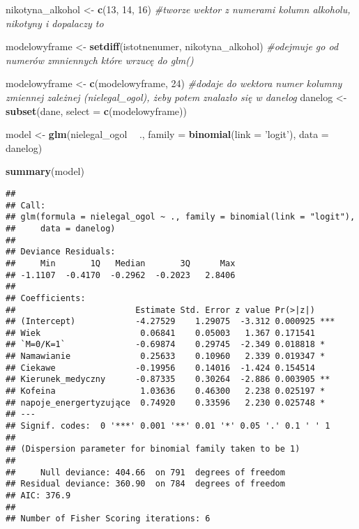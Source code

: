 \documentclass[]{article}
\newenvironment{Shaded}{\begin{snugshade}}{\end{snugshade}}
\newcommand{\KeywordTok}[1]{\textcolor[rgb]{0.13,0.29,0.53}{\textbf{#1}}}
\newcommand{\DataTypeTok}[1]{\textcolor[rgb]{0.13,0.29,0.53}{#1}}
\newcommand{\DecValTok}[1]{\textcolor[rgb]{0.00,0.00,0.81}{#1}}
\newcommand{\StringTok}[1]{\textcolor[rgb]{0.31,0.60,0.02}{#1}}
\newcommand{\CommentTok}[1]{\textcolor[rgb]{0.56,0.35,0.01}{\textit{#1}}}
\newcommand{\OperatorTok}[1]{\textcolor[rgb]{0.81,0.36,0.00}{\textbf{#1}}}
\newcommand{\NormalTok}[1]{#1}
\begin{document}
\begin{Shaded}
\begin{Highlighting}[]
\NormalTok{nikotyna_alkohol <-}\StringTok{ }\KeywordTok{c}\NormalTok{(}\DecValTok{13}\NormalTok{, }\DecValTok{14}\NormalTok{, }\DecValTok{16}\NormalTok{) }\CommentTok{#tworze wektor z numerami kolumn alkoholu, nikotyny i dopalaczy to }

\NormalTok{modelowyframe <-}\StringTok{ }\KeywordTok{setdiff}\NormalTok{(istotnenumer, nikotyna_alkohol) }\CommentTok{#odejmuje go od numerów zmniennych które wrzucę do glm()}

\NormalTok{modelowyframe <-}\StringTok{ }\KeywordTok{c}\NormalTok{(modelowyframe, }\DecValTok{24}\NormalTok{) }\CommentTok{#dodaje do wektora numer kolumny zmiennej zależnej (nielegal_ogol), żeby potem znalazło się w danelog}
\NormalTok{danelog <-}\StringTok{ }\KeywordTok{subset}\NormalTok{(dane, }\DataTypeTok{select =} \KeywordTok{c}\NormalTok{(modelowyframe))}

\NormalTok{model <-}
\StringTok{  }\KeywordTok{glm}\NormalTok{(nielegal_ogol }\OperatorTok{~}\StringTok{ }\NormalTok{.,}
      \DataTypeTok{family =} \KeywordTok{binomial}\NormalTok{(}\DataTypeTok{link =} \StringTok{'logit'}\NormalTok{),}
      \DataTypeTok{data =}\NormalTok{ danelog)}

\KeywordTok{summary}\NormalTok{(model)}
\end{Highlighting}
\end{Shaded}

\begin{verbatim}
## 
## Call:
## glm(formula = nielegal_ogol ~ ., family = binomial(link = "logit"), 
##     data = danelog)
## 
## Deviance Residuals: 
##     Min       1Q   Median       3Q      Max  
## -1.1107  -0.4170  -0.2962  -0.2023   2.8406  
## 
## Coefficients:
##                        Estimate Std. Error z value Pr(>|z|)    
## (Intercept)            -4.27529    1.29075  -3.312 0.000925 ***
## Wiek                    0.06841    0.05003   1.367 0.171541    
## `M=0/K=1`              -0.69874    0.29745  -2.349 0.018818 *  
## Namawianie              0.25633    0.10960   2.339 0.019347 *  
## Ciekawe                -0.19956    0.14016  -1.424 0.154514    
## Kierunek_medyczny      -0.87335    0.30264  -2.886 0.003905 ** 
## Kofeina                 1.03636    0.46300   2.238 0.025197 *  
## napoje_energertyzujące  0.74920    0.33596   2.230 0.025748 *  
## ---
## Signif. codes:  0 '***' 0.001 '**' 0.01 '*' 0.05 '.' 0.1 ' ' 1
## 
## (Dispersion parameter for binomial family taken to be 1)
## 
##     Null deviance: 404.66  on 791  degrees of freedom
## Residual deviance: 360.90  on 784  degrees of freedom
## AIC: 376.9
## 
## Number of Fisher Scoring iterations: 6
\end{verbatim}
\end{document}
